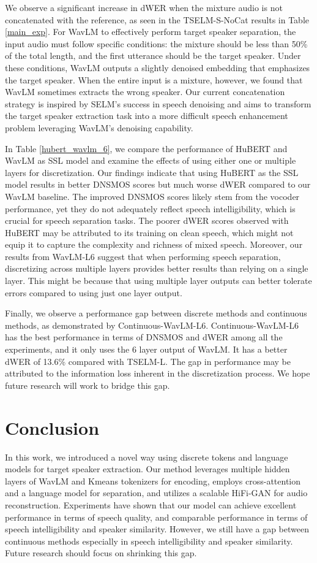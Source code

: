 \documentclass[conference]{IEEEtran}
\begin{document}
We observe a significant increase in dWER when the mixture audio is not concatenated with the reference, as seen in the TSELM-S-NoCat results in Table \ref{main_exp}. For WavLM to effectively perform target speaker separation, the input audio must follow specific conditions: the mixture should be less than 50\% of the total length, and the first utterance should be the target speaker. Under these conditions, WavLM outputs a slightly denoised embedding that emphasizes the target speaker. When the entire input is a mixture, however, we found that WavLM sometimes extracts the wrong speaker.
Our current concatenation strategy is inspired by SELM's \cite{selm} success in speech denoising and aims to transform the target speaker extraction task into a more difficult speech enhancement problem leveraging WavLM's denoising capability.

In Table \ref{hubert_wavlm_6}, we compare the performance of HuBERT and WavLM as SSL model and examine the effects of using either one or multiple layers for discretization. Our findings indicate that using HuBERT as the SSL model results in better DNSMOS scores but much worse dWER compared to our WavLM baseline. The improved DNSMOS scores likely stem from the vocoder performance, yet they do not adequately reflect speech intelligibility, which is crucial for speech separation tasks. 
The poorer dWER scores observed with HuBERT may be attributed to its training on clean speech, which might not equip it to capture the complexity and richness of mixed speech. Moreover, our results from WavLM-L6 suggest that when performing speech separation, discretizing across multiple layers provides better results than relying on a single layer.  This might be because that using multiple layer outputs can better tolerate errors compared to using just one layer output.

Finally, we observe a performance gap between discrete methods and continuous methods, as demonstrated by Continuous-WavLM-L6.
Continuous-WavLM-L6 has the best performance in terms of DNSMOS and dWER among all the experiments, and it only uses the 6 layer output of WavLM. 
It has a better dWER of 13.6\% compared with TSELM-L. The gap in performance may be attributed to the information loss inherent in the discretization process. 
We hope future research will work to bridge this gap.   

\section{Conclusion}
In this work, we introduced a novel way using discrete tokens and language models for target speaker extraction.
Our method leverages multiple hidden layers of WavLM and Kmeans tokenizers for encoding, employs cross-attention and a language model for separation, and utilizes a scalable HiFi-GAN for audio reconstruction.
Experiments have 
shown that our model can achieve excellent performance in terms of speech quality, and comparable performance in terms of speech intelligibility and 
speaker similarity. However, we still have a gap between continuous methods especially in speech intelligibility and speaker similarity. Future research should focus on shrinking 
this gap. 
\end{document}
